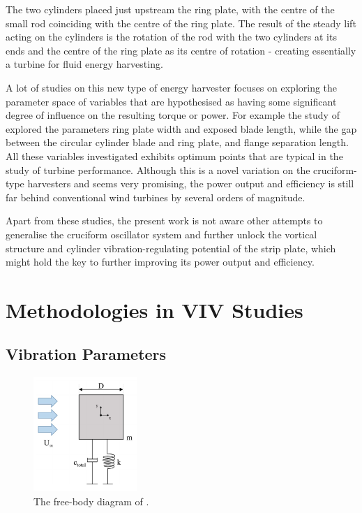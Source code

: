 \documentclass[oneside]{utmthesis}
\begin{document}
The two cylinders placed just upstream the ring plate, with the centre of the small rod coinciding with the centre of the ring plate. The result of the steady lift acting on the cylinders is the rotation of the rod with the two cylinders at its ends and the centre of the ring plate as its centre of rotation - creating essentially a turbine for fluid energy harvesting.

A lot of studies on this new type of energy harvester focuses on exploring the parameter space of variables that are hypothesised as having some significant degree of influence on the resulting torque or power. For example the study of \citet{Hemsuwan2021} explored the parameters ring plate width and exposed blade length, while \citet{Sakamoto2021} the gap between the circular cylinder blade and ring plate, and flange separation length. All these variables investigated exhibits optimum points that are typical in the study of turbine performance. Although this is a novel variation on the cruciform-type harvesters and seems very promising, the power output and efficiency is still far behind conventional wind turbines by several orders of magnitude.

Apart from these studies, the present work is not aware other attempts to generalise the cruciform oscillator system and further unlock the vortical structure and cylinder vibration-regulating potential of the strip plate, which might hold the key to further improving its power output and efficiency.

\section{Methodologies in VIV Studies} \label{sec:vivMethods}

\subsection{Vibration Parameters} \label{ssec:vibPara}

\begin{figure}[!h]
  \centering
  \hspace{1cm} \includegraphics[width=0.35\textwidth]{figs/shafinazFBD}
  \caption{The free-body diagram of \citet{Maruai2019}.}
  \label{fig:shafinazFBD}
\end{figure}
\end{document}
